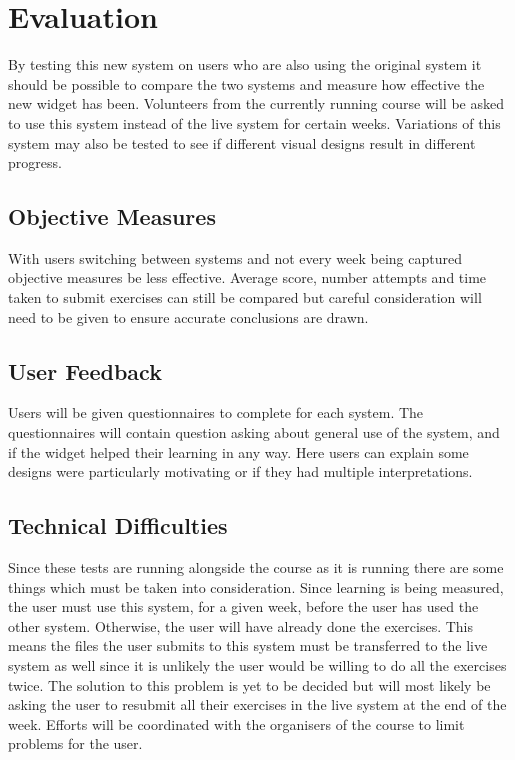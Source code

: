 \chapter{Evaluation}
\label{evaluation}
By testing this new system on users who are also using the original system it should be possible to compare the two systems and measure how effective the new widget has been. Volunteers from the currently running course will be asked to use this system instead of the live system for certain weeks. Variations of this system may also be tested to see if different visual designs result in different progress.

\section{Objective Measures}
With users switching between systems and not every week being captured objective measures be less effective. Average score, number attempts and time taken to submit exercises can still be compared but careful consideration will need to be given to ensure accurate conclusions are drawn.

\section{User Feedback}
Users will be given questionnaires to complete for each system. The questionnaires will contain question asking about general use of the system, and if the widget helped their learning in any way. Here users can explain some designs were particularly motivating or if they had multiple interpretations.

\section{Technical Difficulties}
Since these tests are running alongside the course as it is running there are some things which must be taken into consideration. Since learning is being measured, the user must use this system, for a given week, before the user has used the other system. Otherwise, the user will have already done the exercises. This means the files the user submits to this system must be transferred to the live system as well since it is unlikely the user would be willing to do all the exercises twice. The solution to this problem is yet to be decided but will most likely be asking the user to resubmit all their exercises in the live system at the end of the week. Efforts will be coordinated with the organisers of the course to limit problems for the user.
